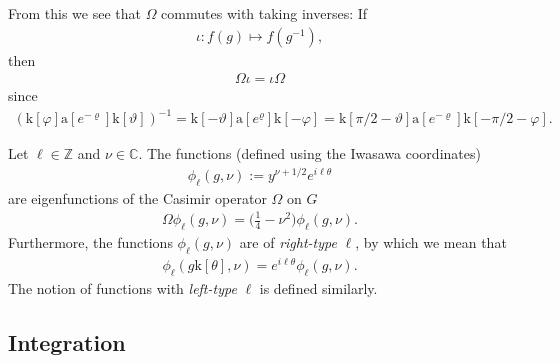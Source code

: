 \documentclass[12pt]{amsart}
\theoremstyle{definition}
\theoremstyle{remark}
\numberwithin{equation}{section}
\newcommand{\C}{{\mathbb C}}
\newcommand{\Z}{{\mathbb Z}}
\newcommand{\1}{{\mathbf 1}}
\renewcommand{\a}{\mathrm{a}}
\renewcommand{\k}{\mathrm{k}}
\begin{document}
From this we see that $\Omega$ commutes with taking inverses: If
\begin{align*}
    \iota: f(g) \mapsto f(g^{-1}),
\end{align*}
then
\begin{align}\label{eq:Omegaiotacommute}
    \Omega \iota = \iota \Omega 
\end{align}
since
\begin{align*}
    (\k[\varphi] \a[e^{-\varrho}] \k[\vartheta])^{-1} =   \k[-\vartheta]\a[e^{\varrho}] \k[-\varphi] =\k[\pi/2-\vartheta]\a[e^{-\varrho}] \k[-\pi/2-\varphi].
\end{align*}

Let $\ell \in \Z$ and $\nu \in \C$. The functions (defined using the Iwasawa coordinates)
\begin{align} \label{eq:phibasicdefinition}
    \phi_{\ell}(g,\nu):=y^{\nu+1/2} e^{ i\ell \theta}
\end{align}
 are eigenfunctions of the Casimir operator $\Omega$ on $G$
\begin{align*}
    \Omega   \phi_{\ell}(g,\nu) = \bigg(\frac{1}{4}-\nu^2\bigg) \phi_{\ell}(g,\nu).
\end{align*}
Furthermore, the functions $ \phi_{\ell}(g,\nu)$ are of \emph{right-type} $\ell$, by which we mean that
\begin{align*}
 \phi_{\ell}(g \mathrm{k}[\theta],\nu) = e^{i \ell \theta}   \phi_{\ell}(g,\nu).
\end{align*}
The notion of functions with \emph{left-type} $\ell$ is defined similarly.
\subsection{Integration}
\end{document}
